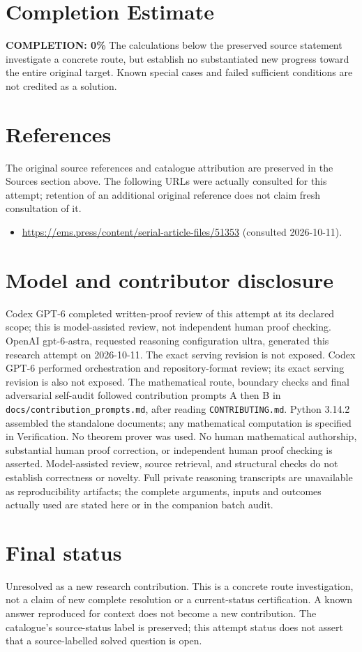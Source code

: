 \documentclass[11pt]{article}
\begin{document}
\section{Completion Estimate}
\noindent\textbf{COMPLETION: 0\%}
The calculations below the preserved source statement investigate a concrete route,
but establish no substantiated new progress toward the entire original target.
Known special cases and failed sufficient conditions are not credited as a solution.
\section{References}
The original source references and catalogue attribution are preserved in the
Sources section above. The following URLs were actually consulted for this attempt;
retention of an additional original reference does not claim fresh consultation of it.
\begin{itemize}
\item \url{https://ems.press/content/serial-article-files/51353} (consulted 2026-10-11). 
\end{itemize}
\section{Model and contributor disclosure}
Codex GPT-6 completed written-proof review of this attempt at its declared scope; this is model-assisted review, not independent human proof checking.
OpenAI gpt-6-astra, requested reasoning configuration ultra, generated this research
attempt on 2026-10-11. The exact serving revision is not exposed. Codex GPT-6
performed orchestration and repository-format review; its exact serving revision
is also not exposed. The mathematical route, boundary checks and final adversarial
self-audit followed contribution prompts A then B in
\texttt{docs/contribution\_prompts.md}, after reading \texttt{CONTRIBUTING.md}.
Python 3.14.2 assembled the standalone documents; any mathematical computation is
specified in Verification. No theorem prover was used. No human mathematical
authorship, substantial human proof correction, or independent human proof checking
is asserted. Model-assisted review, source retrieval, and structural checks do not
establish correctness or novelty. Full private reasoning transcripts are unavailable
as reproducibility artifacts; the complete arguments, inputs and outcomes actually
used are stated here or in the companion batch audit.
\section{Final status}
Unresolved as a new research contribution. This is a concrete route investigation,
not a claim of new complete resolution or a current-status certification. A known
answer reproduced for context does not become a new contribution. The catalogue's
source-status label is preserved; this attempt status does not assert that a
source-labelled solved question is open.
\end{document}
